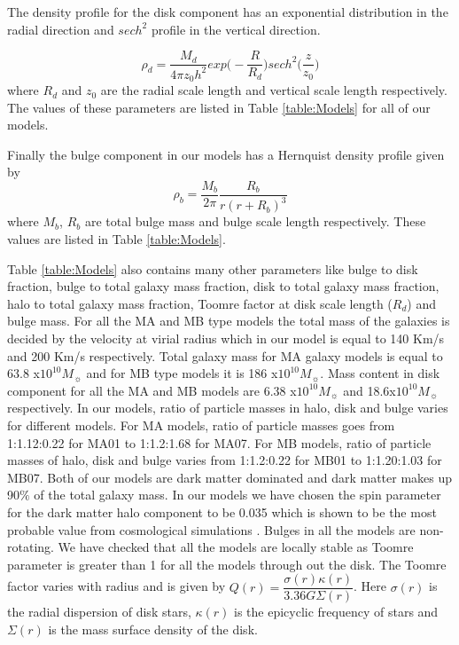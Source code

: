 \documentclass[a4paper,fleqn,usenatbib,useAMS]{mnras}
\begin{document}
The density profile for the disk component has an exponential  distribution in the radial direction and $sech^2$ profile in the vertical direction. 

\begin{equation}
\rho_d=\dfrac{M_d}{4 \pi z_0 h^2} exp\Bigg(-\dfrac{R}{R_d}\Bigg) sech^2\Bigg(\dfrac{z}{z_0}\Bigg)
\end{equation}
where $R_d$ and $z_0$ are the radial scale length and vertical scale length respectively. The values of these parameters are listed in Table \ref{table:Models} for all of our models. 

Finally the bulge component in our models has a Hernquist density profile given by
\begin{equation}
\rho_b=\dfrac{M_{b}}{2 \pi} \dfrac{R_b}{r(r+R_b)^3}
\end{equation}   
where $M_b$, $R_b$ are total bulge mass and bulge scale length respectively. These values are listed in Table \ref{table:Models}.


Table \ref{table:Models} also contains many other parameters like bulge to disk fraction, bulge to total galaxy mass fraction, disk to total galaxy mass fraction, halo to total galaxy mass fraction, Toomre factor at disk scale length ($R_{d}$) and bulge mass. For all the MA and MB type models the total mass of the galaxies is decided by the velocity at virial radius which in our model is equal to 140 Km/s and 200 Km/s respectively. Total galaxy mass for MA galaxy models is equal to 63.8 x$10^{10} M_{\sun}$ and for MB type models it is 186 x$10^{10} M_{\sun}$. Mass content in disk component for all the MA and MB models are 6.38 x$10^{10} M_{\sun}$ and 18.6x$10^{10} M_{\sun}$ respectively. In our models, ratio of particle masses in halo, disk and bulge varies for different models. For MA models, ratio of particle masses goes from 1:1.12:0.22 for MA01 to 1:1.2:1.68 for MA07. For MB models, ratio of particle masses of halo, disk and bulge varies from 1:1.2:0.22 for MB01 to 1:1.20:1.03 for MB07. Both of our models are dark matter dominated and dark matter makes up 90$\%$ of the total galaxy mass. In our models we have chosen the spin parameter for the dark matter halo component  to be 0.035 which is shown to be the most probable value from cosmological simulations \citep{54b}. Bulges in all the models are non-rotating. We have checked that all the models are locally stable as Toomre parameter is greater than 1 for all the models through out the disk. The Toomre factor varies with radius and is given by $Q(r)=\dfrac{\sigma(r)\kappa(r)}{3.36G\Sigma(r)}$. Here $\sigma(r)$ is the radial dispersion of disk stars, $\kappa(r)$ is the epicyclic frequency of stars and $\Sigma(r)$ is the mass surface density of the disk.    
\end{document}
